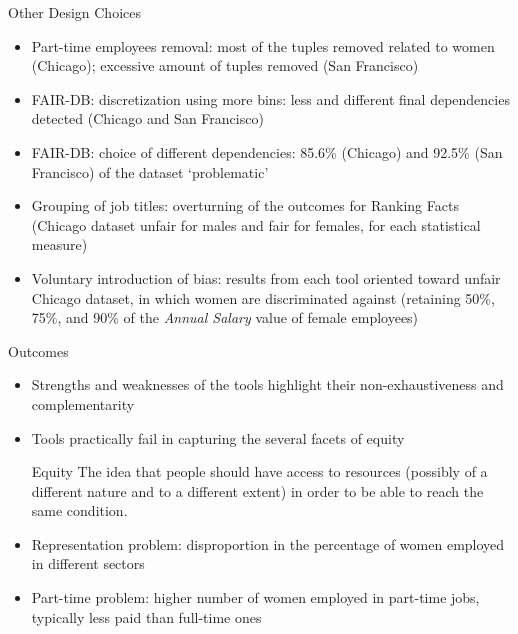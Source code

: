 \documentclass[usenames,dvipsnames]{beamer}
\begin{document}
    
    \begin{frame}{Other Design Choices}
        \begin{itemize}
            \item \textcolor{defaultBlue}{Part-time employees removal}: most of the tuples removed related to women (Chicago); excessive amount of tuples removed (San Francisco)
            \item \textcolor{defaultBlue}{FAIR-DB: discretization using more bins}: less and different final dependencies detected (Chicago and San Francisco)
            \item \textcolor{defaultBlue}{FAIR-DB: choice of different dependencies}: 85.6\% (Chicago) and 92.5\% (San Francisco) of the dataset `problematic'
            \item \textcolor{defaultBlue}{Grouping of job titles}: overturning of the outcomes for Ranking Facts (Chicago dataset unfair for males and fair for females, for each statistical measure)
            \item \textcolor{defaultBlue}{Voluntary introduction of bias}: results from each tool oriented toward unfair Chicago dataset, in which women are discriminated against (retaining 50\%, 75\%, and 90\% of the \textit{Annual Salary} value of female employees)
        \end{itemize}
    \end{frame}
    
    
    \begin{frame}{Outcomes}
        \begin{itemize}
            \item Strengths and weaknesses of the tools highlight their non-exhaustiveness and complementarity
            \item Tools practically fail in capturing the several facets of \alert{equity}
            \begin{block}{Equity}
                The idea that people should have access to resources (possibly of a different nature and to a different extent) in order to be able to reach the same condition.
            \end{block}
            \item \textcolor{defaultBlue}{Representation problem}: disproportion in the percentage of women employed in different sectors
            \item \textcolor{defaultBlue}{Part-time problem}: higher number of women employed in part-time jobs, typically less paid than full-time ones
        \end{itemize}
    \end{frame}
    
\end{document}
